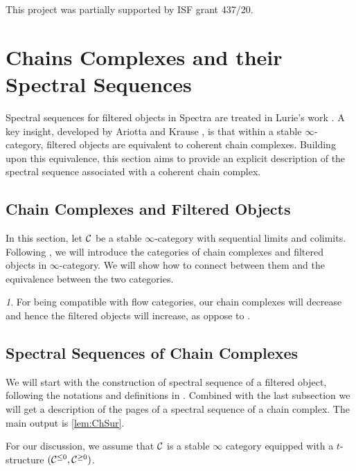\documentclass[a4paper,11pt]{article}
\theoremstyle{plain}
\theoremstyle{definition}
\theoremstyle{remark}
\newtheorem{rem}[thm]{\protect\remarkname}
\providecommand{\remarkname}{Remark}
\begin{document}
This project was partially supported by ISF grant 437/20.
\newpage

\section{Chains Complexes and their Spectral Sequences}\label{sec:Ch}
Spectral sequences for filtered objects in Spectra are treated in Lurie's work \cite{Lur17}. A key insight, developed by Ariotta and Krause \cite{Ari21}, is that within a stable $\infty$-category, filtered objects are equivalent to coherent chain complexes. Building upon this equivalence, this section aims to provide an explicit description of the spectral sequence associated with a coherent chain complex.

\subsection{Chain Complexes and Filtered Objects} \label{subsec:Ch&fil}
In this section, let $\mathcal{C}$ be a stable $\infty$-category with sequential limits and colimits.
Following \cite{Ari21}, we will introduce the categories of chain complexes and filtered objects in $\infty$-category. We will show how to connect between them and the equivalence between the two categories.

\begin{rem}
    For being compatible with flow categories, our chain complexes will decrease and hence the filtered objects will increase, as oppose to \cite{Ari21}.
\end{rem}



\subsection{Spectral Sequences of Chain Complexes}\label{sec:SSofCh}
We will start with the construction of spectral sequence of a filtered object, following the notations and definitions in \cite{Lur09}. Combined with the last subsection we will get a description of the pages of a spectral sequence of a chain complex. The main output is \cref{lem:ChSur}.

For our discussion, we assume that $\mathcal{C}$ is a stable $\infty$ category equipped with a $t$-structure $(\mathcal{C}^{\leq 0}, \mathcal{C}^{\geq 0})$.


\end{document}
